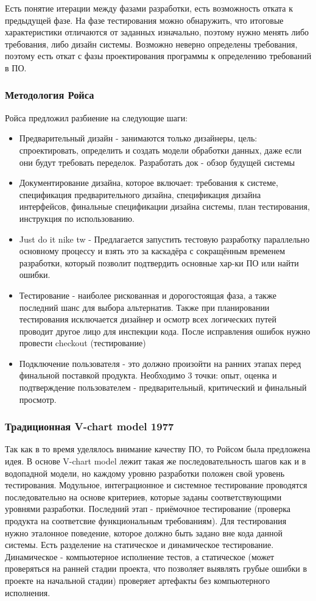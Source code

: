 Есть понятие итерации между фазами разработки, есть возможность отката к предыдущей фазе. 
На фазе тестирования можно обнаружить, что итоговые характеристики отличаются от заданных изначально, поэтому нужно менять либо требования, либо дизайн системы. 
Возможно неверно определены требования, поэтому есть откат с фазы проектирования программы к определению требований в ПО.
\subsubsection{Методология Ройса}
Ройса предложил разбиение на следующие шаги:
\begin{itemize}
    \item Предварительный дизайн - занимаются только дизайнеры, цель: спроектировать, определить и создать модели обработки данных, даже если они будут требовать переделок. Разработать док - обзор будущей системы
    \item Документирование дизайна, которое включает: требования к системе, спецификация предварительного
    дизайна, спецификация дизайна интерфейсов, финальные спецификации дизайна системы, план
    тестирования, инструкция по использованию.
    \item Just do it nike tw - Предлагается запустить тестовую разработку параллельно основному процессу и взять это за каскадёра с сокращённым временем разработки, который позволит подтвердить основные хар-ки ПО или найти ошибки. 
    \item Тестирование - наиболее рискованная и дорогостоящая фаза, а также последний шанс для выбора альтернатив. Также при планировании тестирования исключается дизайнер и осмотр всех логических путей проводит другое лицо для инспекции кода. После исправления ошибок нужно провести checkout (тестирование)
    \item Подключение пользователя - это должно произойти на ранних этапах перед финальной поставкой продукта. Необходимо 3 точки: опыт, оценка и подтверждение пользователем - предварительный, критический и финальный просмотр.
\end{itemize}

\subsubsection{Традиционная V-chart model 1977}
Так как в то время уделялось внимание качеству ПО, то Ройсом была предложена идея. В основе V-chart model лежит такая же последовательность шагов как и в водопадной модели, но каждому уровню разработки положен свой уровень тестирования. Модульное, интеграционное и системное тестирование проводятся последовательно на основе критериев, которые заданы соответствующими уровнями разработки. Последний этап - приёмочное тестирование (проверка продукта на соответсвие функциональным требованиям).
Для тестирования нужно эталонное поведение, которое должно быть задано вне кода данной системы.
Есть разделение на статическое и динамическое тестирование. Динамическое - компьютерное исполнение тестов, а статическое (может проверяться на ранней стадии проекта, что позволяет выявлять грубые ошибки в проекте на начальной стадии) проверяет артефакты без компьютерного исполнения. 

